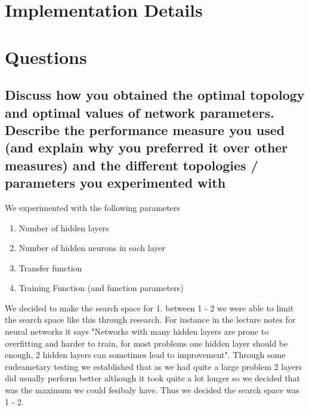 \documentclass[11pt]{article}
\begin{document}
\section{Implementation Details}
\section{Questions}

\subsection{Discuss how you obtained the optimal topology and optimal values of network parameters. Describe the performance measure you used (and explain why you preferred it over other measures) and the different topologies / parameters you experimented with}



We experimented with the following parameters
\begin{enumerate}
  \item Number of hidden layers
  \item Number of hidden neurons in each layer
  \item Transfer function
  \item Training Function (and function parameters)
\end{enumerate}

We decided to make the search space for 1. between 1 - 2 we were able to limit the search space like this through research. For instance in the lecture notes for neural networks it says "Networks with many hidden layers are prone to overfitting and harder to train, for most problems one hidden layer should be enough, 2 hidden layers can sometimes lead to improvement". Through some
rudeametary testing we established that as we had quite a large problem 2 layers did usually perform better although it took
quite a lot longer so we decided that was the maximum we could fesibaly have. Thus we decided the search space was 1 - 2.
\end{document}
